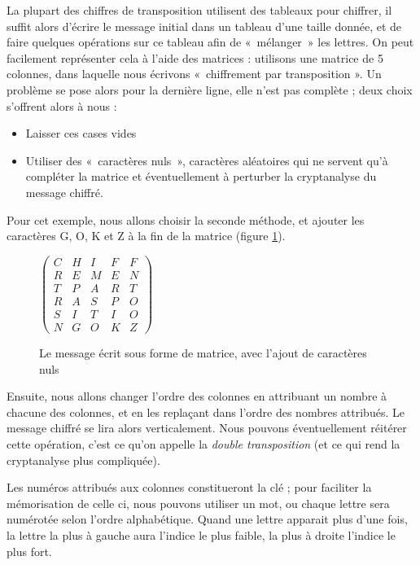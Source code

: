 La plupart des chiffres de transposition utilisent des tableaux pour
chiffrer, il suffit alors d'écrire le message initial dans un tableau
d'une taille donnée, et de faire quelques opérations sur ce tableau
afin de «~mélanger~» les lettres. On peut facilement représenter cela
à l'aide des matrices : utilisons une matrice de 5
colonnes, dans laquelle nous écrivons «~chiffrement par transposition
». Un problème se pose alors pour la dernière ligne, elle n'est pas
complète ; deux choix s'offrent alors à nous : 
\begin{itemize}
  \item Laisser ces cases vides
  \item Utiliser des «~caractères nuls~», caractères aléatoires qui ne
    servent qu'à compléter la matrice et éventuellement à perturber la
    cryptanalyse du message chiffré.
\end{itemize}
Pour cet exemple, nous allons choisir la seconde méthode, et ajouter
les caractères G, O, K et Z à la fin de la matrice (figure
\ref{fig:TranspositionMatriceNul}).
\begin{figure}[h]
  \begin{center}
  $
  \left(
    \begin{array}{ccccc}
      C & H & I & F & F \\
      R & E & M & E & N \\
      T & P & A & R & T \\
      R & A & S & P & O \\
      S & I & T & I & O \\
      N & G & O & K & Z 
    \end{array}
  \right)
  $
  \end{center}
  \caption{Le message écrit sous forme de matrice, avec l'ajout de
    caractères nuls}
  \label{fig:TranspositionMatriceNul}
\end{figure}

Ensuite, nous allons changer l'ordre des colonnes en attribuant un
nombre à chacune des colonnes, et en les replaçant dans l'ordre des
nombres attribués. Le message chiffré se lira alors verticalement.
Nous pouvons éventuellement réitérer cette opération, c'est ce qu'on
appelle la \emph{double transposition} (et ce qui rend la cryptanalyse plus
compliquée).

Les numéros attribués aux colonnes constitueront la clé ; pour
faciliter la mémorisation de celle ci, nous pouvons utiliser un mot,
ou chaque lettre sera numérotée selon l'ordre alphabétique. Quand une
lettre apparait plus d'une fois, la lettre la plus à gauche aura
l'indice le plus faible, la plus à droite l'indice le plus fort.

